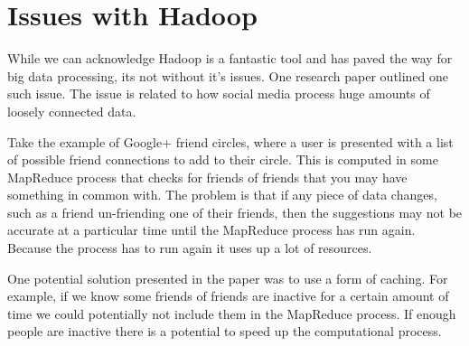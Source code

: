\section{Issues with Hadoop}

While we can acknowledge Hadoop is a fantastic tool and has paved the way for big data processing, its not without it's issues. One research paper outlined one such issue\cite[pg.3]{hadoop-issues}. The issue is related to how social media process huge amounts of loosely connected data. 

Take the example of Google+ friend circles, where a user is presented with a list of possible friend connections to add to their circle. This is computed in some MapReduce process that checks for friends of friends that you may have something in common with. The problem is that if any piece of data changes, such as a friend un-friending one of their friends, then the suggestions may not be accurate at a particular time until the MapReduce process has run again. Because the process has to run again it uses up a lot of resources. 

One potential solution presented in the paper was to use a form of caching\cite[pg.3-4]{hadoop-issues}. For example, if we know some friends of friends are inactive for a certain amount of time we could potentially not include them in the MapReduce process. If enough people are inactive there is a potential to speed up the computational process.